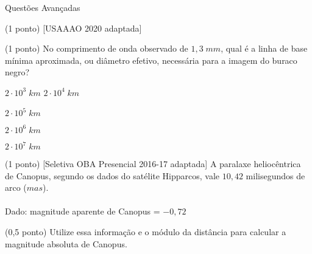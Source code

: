 \documentclass{../lista}
\begin{document}
\begin{secao}{Questões Avançadas}
\begin{questao}{(1 ponto) [USAAAO 2020 adaptada]}
			\begin{pergunta}{(1 ponto)}
				No comprimento de onda observado de $1,3 \; mm$, qual é a linha de base mínima aproximada, ou diâmetro efetivo, necessária para a imagem do buraco negro?


				\begin{alternativas}
					\item $2 \cdot 10^3 \; km$
					\alternativaMarcada $2 \cdot 10^4 \; km$
					\item $2 \cdot 10^5 \; km$
					\item $2 \cdot 10^6 \; km$
					\item $2 \cdot 10^7 \; km$
				\end{alternativas}
			\end{pergunta}
		\end{questao}

		\begin{questao}{(1 ponto) [Seletiva OBA Presencial 2016-17 adaptada]}
			A paralaxe heliocêntrica de Canopus, segundo os dados do satélite Hipparcos, vale $10,42$ milisegundos de arco ($mas$). \\ \\
			Dado: magnitude aparente de Canopus = $-0,72$

			\begin{pergunta}{(0,5 ponto)}
				Utilize essa informação e o módulo da distância para calcular a magnitude absoluta de Canopus.


\end{pergunta}
\end{questao}
\end{secao}
\end{document}
